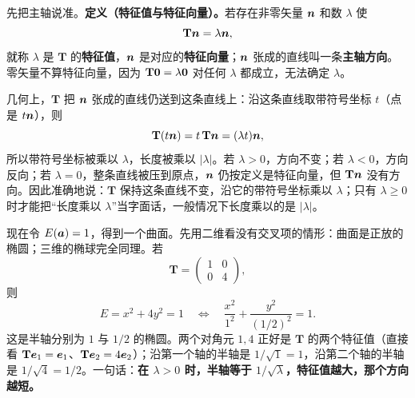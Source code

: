 \documentclass[11pt]{ctexart}
\newcommand{\ten}[1]{\mathbf{#1}}
\let\origsubhdr\subhdr
\renewcommand{\subhdr}[1]{\par\needspace{3\baselineskip}\origsubhdr{#1}}
\begin{document}
\label{subsec:ellipsoid}

先把主轴说准。\textbf{定义（特征值与特征向量）。}若存在非零矢量 $\boldsymbol{n}$ 和数 $\lambda$ 使
\[
\ten T\vect n=\lambda\vect n,
\]
就称 $\lambda$ 是 $\ten T$ 的\textbf{特征值}，$\boldsymbol{n}$ 是对应的\textbf{特征向量}；$\boldsymbol{n}$ 张成的直线叫一条\textbf{主轴方向}。零矢量不算特征向量，因为 $\ten T\vect0=\lambda\vect0$ 对任何 $\lambda$ 都成立，无法确定 $\lambda$。

几何上，$\ten T$ 把 $\boldsymbol{n}$ 张成的直线仍送到这条直线上：沿这条直线取带符号坐标 $t$（点是 $t\boldsymbol{n}$），则
\[
\ten T(t\vect n)=t\,\ten T\vect n=(\lambda t)\vect n,
\]
所以带符号坐标被乘以 $\lambda$，长度被乘以 $|\lambda|$。若 $\lambda>0$，方向不变；若 $\lambda<0$，方向反向；若 $\lambda=0$，整条直线被压到原点，$\boldsymbol{n}$ 仍按定义是特征向量，但 $\ten T\vect n$ 没有方向。因此准确地说：$\ten T$ 保持这条直线不变，沿它的带符号坐标乘以 $\lambda$；只有 $\lambda\ge0$ 时才能把“长度乘以 $\lambda$”当字面话，一般情况下长度乘以的是 $|\lambda|$。

现在令 $E(\boldsymbol{a})=1$，得到一个曲面。先用二维看没有交叉项的情形：曲面是正放的椭圆；三维的椭球完全同理。若
\[
\ten T=\begin{pmatrix}1&0\\0&4\end{pmatrix},
\]
则
\[
E=x^2+4y^2=1
\quad\Longleftrightarrow\quad
\frac{x^2}{1^2}+\frac{y^2}{(1/2)^2}=1 .
\]
这是半轴分别为 $1$ 与 $1/2$ 的椭圆。两个对角元 $1,4$ 正好是 $\ten T$ 的两个特征值（直接看 $\ten T\vect e_1=\vect e_1$、$\ten T\vect e_2=4\vect e_2$）；沿第一个轴的半轴是 $1/\sqrt1=1$，沿第二个轴的半轴是 $1/\sqrt4=1/2$。一句话：\textbf{在 $\lambda>0$ 时，半轴等于 $1/\sqrt{\lambda}$，特征值越大，那个方向越短。}
\end{document}
